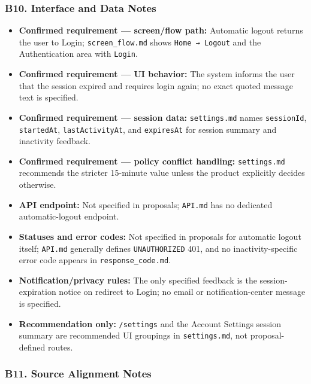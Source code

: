 \documentclass[12pt]{article}
\begin{document}
\hypertarget{sec:b10-interface-and-data-notes}{}
\subsubsection*{B10. Interface and Data Notes}
\par\medskip

\begin{itemize}
\item \textbf{Confirmed requirement --- screen/flow path:} Automatic logout returns the user to Login; \texttt{screen\_flow.md} shows \texttt{Home → Logout} and the Authentication area with \texttt{Login}.
\item \textbf{Confirmed requirement --- UI behavior:} The system informs the user that the session expired and requires login again; no exact quoted message text is specified.
\item \textbf{Confirmed requirement --- session data:} \texttt{settings.md} names \texttt{sessionId}, \texttt{startedAt}, \texttt{lastActivityAt}, and \texttt{expiresAt} for session summary and inactivity feedback.
\item \textbf{Confirmed requirement --- policy conflict handling:} \texttt{settings.md} recommends the stricter 15-minute value unless the product explicitly decides otherwise.
\item \textbf{API endpoint:} Not specified in proposals; \texttt{API.md} has no dedicated automatic-logout endpoint.
\item \textbf{Statuses and error codes:} Not specified in proposals for automatic logout itself; \texttt{API.md} generally defines \texttt{UNAUTHORIZED} 401, and no inactivity-specific error code appears in \texttt{response\_code.md}.
\item \textbf{Notification/privacy rules:} The only specified feedback is the session-expiration notice on redirect to Login; no email or notification-center message is specified.
\item \textbf{Recommendation only:} \texttt{/settings} and the Account Settings session summary are recommended UI groupings in \texttt{settings.md}, not proposal-defined routes.
\end{itemize}
\par\medskip

\hypertarget{sec:b11-source-alignment-notes}{}
\subsubsection*{B11. Source Alignment Notes}
\par\medskip
\end{document}
